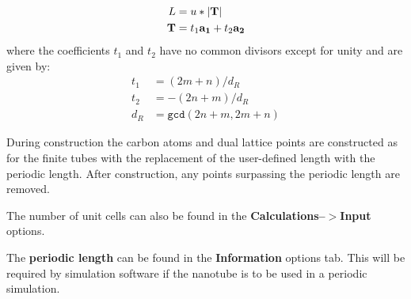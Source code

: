 \begin{equation*}
\begin{split}
L &= u*|\boldsymbol{\mathrm{T}}|\\
\boldsymbol{\mathrm{T}}  &= t_1\boldsymbol{\mathrm{a_1}} + t_2\boldsymbol{\mathrm{a_2}}
 \end{split}
\end{equation*}
\noindent where the coefficients $t_1$ and $t_2$ have no common divisors except for unity and are given by:
\begin{equation*}
\begin{split}
 t_1 &= (2m + n)/ d_{R} \\
 t_2 &= -(2n + m)/ d_{R} \\
d_{R} &= \texttt{gcd}(2n+m, 2m+n)
 \end{split}
\end{equation*}

During construction the carbon atoms and dual lattice points are constructed as for the finite tubes with the replacement of the user-defined length with the periodic length. After construction, any points surpassing the periodic length are removed.

The number of unit cells can also be found in the \textbf{Calculations--$>$Input} options.

The \textbf{periodic length} can be found in the \textbf{Information} options tab. This will be required by simulation software if the nanotube is to be
used in a periodic simulation.

%